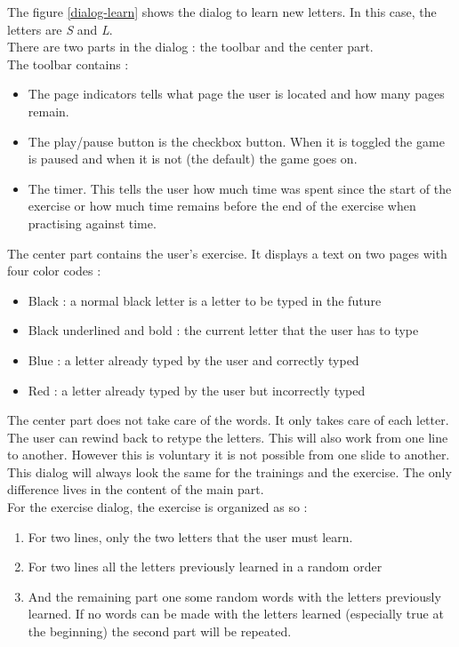 The figure \ref{dialog-learn} shows the dialog to learn new letters. In this case, the letters are \textit{S} and \textit{L}.\\
There are two parts in the dialog : the toolbar and the center part.\\
The toolbar contains :
\begin{itemize}
	\item The page indicators tells what page the user is located and how many pages remain.
	\item The play/pause button is the checkbox button. When it is toggled the game is paused and when it is not (the default) the game goes on.
	\item The timer. This tells the user how much time was spent since the start of the exercise or how much time remains before the end of the exercise when practising against time.
\end{itemize}

The center part contains the user's exercise. It displays a text on two pages with four color codes :
\begin{itemize}
	\item Black : a normal black letter is a letter to be typed in the future
	\item Black underlined and bold : the current letter that the user has to type
	\item Blue : a letter already typed by the user and correctly typed
	\item Red  : a letter already typed by the user but incorrectly typed
\end{itemize}

The center part does not take care of the words. It only takes care of each letter.\\
The user can rewind back to retype the letters. This will also work from one line to another. However this is voluntary it is not possible from one slide to another.\\
This dialog will always look the same for the trainings and the exercise. The only difference lives in the content of the main part.\\
For the exercise dialog, the exercise is organized as so :
\begin{enumerate}
	\item For two lines, only the two letters that the user must learn.
	\item For two lines all the letters previously learned in a random order
	\item And the remaining part one some random words with the letters previously learned. If no words can be made with the letters learned (especially true at the beginning) the second part will be repeated.
\end{enumerate}

